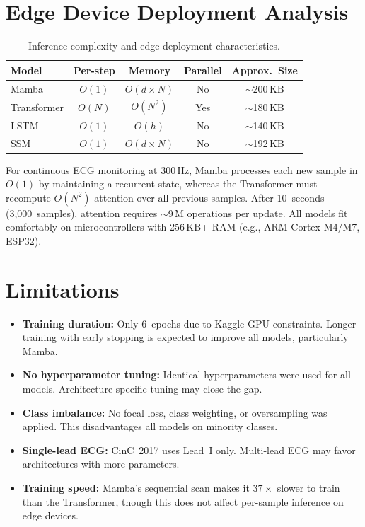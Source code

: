 \documentclass[runningheads]{llncs}
\begin{document}
\section{Edge Device Deployment Analysis}
\label{sec:edge}

\begin{table}[ht]
\centering
\caption{Inference complexity and edge deployment characteristics.}
\label{tab:edge}
\begin{tabular}{@{} l c c c c @{}}
\toprule
\textbf{Model} & \textbf{Per-step} & \textbf{Memory} &
\textbf{Parallel} & \textbf{Approx.\ Size} \\
\midrule
Mamba       & $O(1)$ & $O(d \times N)$ & No  & $\sim$200\,KB \\
Transformer & $O(N)$ & $O(N^2)$        & Yes & $\sim$180\,KB \\
LSTM        & $O(1)$ & $O(h)$          & No  & $\sim$140\,KB \\
SSM         & $O(1)$ & $O(d \times N)$ & No  & $\sim$192\,KB \\
\bottomrule
\end{tabular}
\end{table}

For continuous ECG monitoring at 300\,Hz, Mamba processes each new sample in
$O(1)$ by maintaining a recurrent state, whereas the Transformer must
recompute $O(N^2)$ attention over all previous samples. After 10~seconds
(3,000~samples), attention requires $\sim$9\,M operations per update. All
models fit comfortably on microcontrollers with 256\,KB+ RAM (e.g., ARM
Cortex-M4/M7, ESP32).


\section{Limitations}
\label{sec:limitations}

\begin{itemize}
    \item \textbf{Training duration:} Only 6~epochs due to Kaggle GPU
          constraints. Longer training with early stopping is expected to
          improve all models, particularly Mamba.
    \item \textbf{No hyperparameter tuning:} Identical hyperparameters were
          used for all models. Architecture-specific tuning may close the gap.
    \item \textbf{Class imbalance:} No focal loss, class weighting, or
          oversampling was applied. This disadvantages all models on minority
          classes.
    \item \textbf{Single-lead ECG:} CinC~2017 uses Lead~I only. Multi-lead
          ECG may favor architectures with more parameters.
    \item \textbf{Training speed:} Mamba's sequential scan makes it
          $37\times$ slower to train than the Transformer, though this does not
          affect per-sample inference on edge devices.
\end{itemize}
\end{document}
